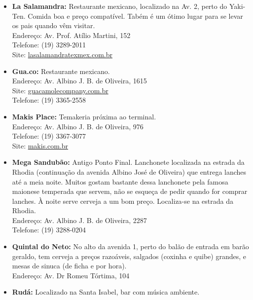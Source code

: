 \begin{itemize}
    \item   \textbf{La Salamandra:} Restaurante mexicano, localizado na Av. 2,
        perto do Yaki-Ten. Comida boa e preço compatível. Tabém é um ótimo lugar
        para se levar os pais quando vêm visitar.
        \\Endereço: Av. Prof. Atílio Martini, 152
        \\Telefone: (19) 3289-2011
        \\Site: \url{lasalamandratexmex.com.br}

    \item    \textbf{Gua.co:} Restaurante mexicano.
        \\Endereço: Av. Albino J. B. de Oliveira, 1615
        \\Site: \url{guacamolecompany.com.br}
        \\Telefone: (19) 3365-2558

    \item   \textbf{Makis Place:} Temakeria próxima ao terminal.
        \\Endereço: Av. Albino J. B. de Oliveira, 976
        \\Telefone: (19) 3367-3077
        \\Site: \url{makis.com.br}

    \item   \textbf{Mega Sandubão:}
      Antigo Ponto Final. Lanchonete localizada na estrada da Rhodia
      (continuação da avenida Albino José de Oliveira) que entrega lanches até
      a meia noite. Muitos gostam bastante dessa lanchonete pela famosa
      maionese temperada que servem, não se esqueça de pedir quando for comprar
      lanches. À noite serve cerveja a um bom preço. Localiza-se na estrada da
      Rhodia.
        \\Endereço: Av. Albino J. B. de Oliveira, 2287
        \\Telefone: (19) 3288-0204

    \item   \textbf{Quintal do Neto:} No alto da avenida 1, perto do balão de
        entrada em barão geraldo, tem cerveja a preços razoáveis, salgados
        (coxinha e quibe) grandes, e mesas de sinuca (de ficha e por hora).
        \\Endereço: Av. Dr Romeu Tórtima, 104

    \item   \textbf{Rudá:} Localizado na Santa Isabel, bar com música ambiente.


\end{itemize}
